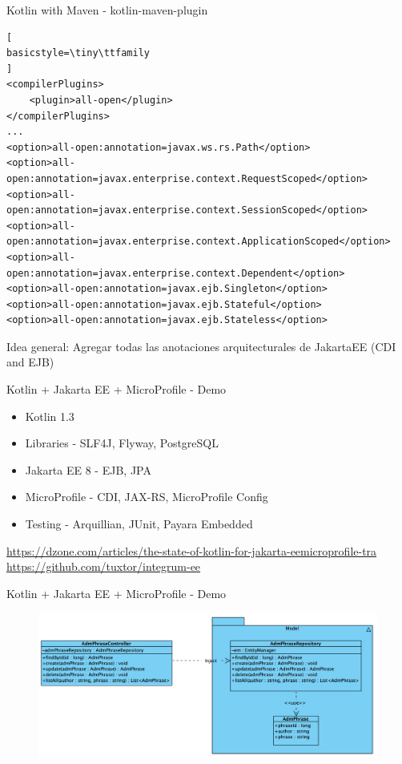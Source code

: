 \documentclass[aspectratio=169]{beamer}
\begin{document}
\begin{frame}[fragile]{Kotlin with Maven - kotlin-maven-plugin}
\begin{lstlisting}[
basicstyle=\tiny\ttfamily
]
<compilerPlugins>
    <plugin>all-open</plugin>
</compilerPlugins>
...
<option>all-open:annotation=javax.ws.rs.Path</option>
<option>all-open:annotation=javax.enterprise.context.RequestScoped</option>
<option>all-open:annotation=javax.enterprise.context.SessionScoped</option>
<option>all-open:annotation=javax.enterprise.context.ApplicationScoped</option>
<option>all-open:annotation=javax.enterprise.context.Dependent</option>
<option>all-open:annotation=javax.ejb.Singleton</option>
<option>all-open:annotation=javax.ejb.Stateful</option>
<option>all-open:annotation=javax.ejb.Stateless</option>
\end{lstlisting}

Idea general: Agregar todas las anotaciones arquitecturales de JakartaEE (CDI and EJB)
\end{frame}

\begin{frame}{Kotlin + Jakarta EE + MicroProfile  - Demo}

\begin{itemize}
	\item Kotlin 1.3
	\item Libraries - SLF4J, Flyway, PostgreSQL
	\item Jakarta EE 8 - EJB, JPA
	\item MicroProfile - CDI, JAX-RS, MicroProfile Config
	\item Testing - Arquillian, JUnit, Payara Embedded
\end{itemize}


\normalsize  \url{https://dzone.com/articles/the-state-of-kotlin-for-jakarta-eemicroprofile-tra}\\
\normalsize  \url{https://github.com/tuxtor/integrum-ee}
\end{frame}

\begin{frame}{Kotlin + Jakarta EE + MicroProfile  - Demo}
\begin{figure}
	\centering
	\includegraphics[width=\linewidth]{Images/integrum-ee}
\end{figure}
\end{frame}
\end{document}
